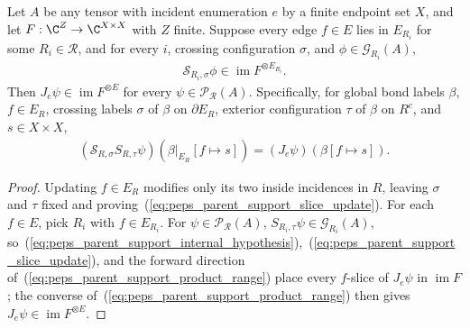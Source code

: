 \begin{lemma}%
    \label{thm:peps_parent_support_internal_slices}
    \leanok
    Let $A$ be any tensor with incident enumeration $e$ by a finite
    endpoint set $X$, and let $F:\C^Z\to\C^{X\times X}$ with $Z$
    finite. Suppose every edge $f\in E$ lies in $E_{R_i}$ for some $R_i\in\mathcal R$, and
    for every $i$, crossing configuration $\sigma$, and $\phi\in\mathcal G_{R_i}(A)$,
    \begin{align}
        \mathcal S_{R_i,\sigma}\phi
        \in\operatorname{im}F^{\otimes E_{R_i}}.
        \label{eq:peps_parent_support_internal_hypothesis}
    \end{align}
    Then $J_e\psi\in\operatorname{im}F^{\otimes E}$ for every
    $\psi\in\mathcal P_{\mathcal R}(A)$. Specifically, for global bond labels
    $\beta$, $f\in E_R$, crossing labels $\sigma$ of $\beta$ on $\partial E_R$,
    exterior configuration $\tau$ of $\beta$ on $R^c$, and $s\in X\times X$,
    \begin{align}
        (\mathcal S_{R,\sigma}S_{R,\tau}\psi)
        (\beta|_{E_R}[f\mapsto s])
        =(J_e\psi)(\beta[f\mapsto s]).
        \label{eq:peps_parent_support_slice_update}
    \end{align}
\end{lemma}
\begin{proof}\leanok
    Updating $f\in E_R$ modifies only its two inside incidences in $R$,
    leaving $\sigma$ and $\tau$ fixed and proving~(\ref{eq:peps_parent_support_slice_update}).
    For each $f\in E$, pick $R_i$ with $f\in E_{R_i}$. For
    $\psi\in\mathcal P_{\mathcal R}(A)$, $S_{R_i,\tau}\psi\in\mathcal G_{R_i}(A)$,
    so~(\ref{eq:peps_parent_support_internal_hypothesis}),~(\ref{eq:peps_parent_support_slice_update}),
    and the forward direction of~(\ref{eq:peps_parent_support_product_range})
    place every $f$-slice of $J_e\psi$ in $\operatorname{im}F$; the converse
    of~(\ref{eq:peps_parent_support_product_range}) then gives
    $J_e\psi\in\operatorname{im}F^{\otimes E}$.
\end{proof}

